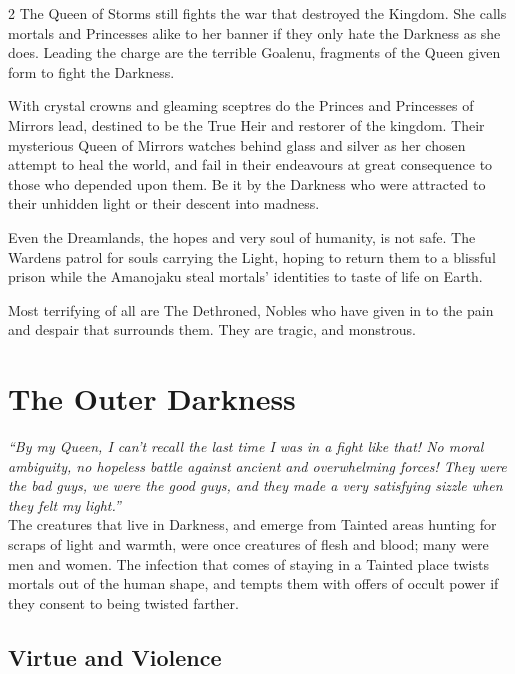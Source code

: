 \begin{multicols}{2}
The Queen of Storms still fights the war that destroyed the Kingdom. She calls mortals and Princesses alike to her banner if they only hate the Darkness as she does. Leading the charge are the terrible Goalenu, fragments of the Queen given form to fight the Darkness. 

With crystal crowns and gleaming sceptres do the Princes and Princesses of Mirrors lead, destined to be the True Heir and restorer of the kingdom. Their mysterious Queen of Mirrors watches behind glass and silver as her chosen attempt to heal the world, and fail in their endeavours at great consequence to those who depended upon them. Be it by the Darkness who were attracted to their unhidden light or their descent into madness.

Even the Dreamlands, the hopes and very soul of humanity, is not safe. The Wardens patrol for souls carrying the Light, hoping to return them to a blissful prison while the Amanojaku steal mortals' identities to taste of life on Earth. 

Most terrifying of all are The Dethroned, Nobles who have given in to the pain and despair that surrounds them. They are tragic, and monstrous.


\section*{The Outer Darkness}
\label{sec:TheOuterDarkness}

\textit{\textquotedblleft By my Queen, I can't recall the last time I was in a fight like that! No moral ambiguity, no hopeless battle against ancient and overwhelming forces! They were the bad guys, we were the good guys, and they made a very satisfying sizzle when they felt my light.\textquotedblright}\\

\noindent The creatures that live in Darkness, and emerge from Tainted areas hunting for scraps of light and warmth, were once creatures of flesh and blood; many were men and women. The infection that comes of staying in a Tainted place twists mortals out of the human shape, and tempts them with offers of occult power if they consent to being twisted farther. 

\begin{mybox}

\subsection*{Virtue and Violence}


\end{mybox}
\end{multicols}
